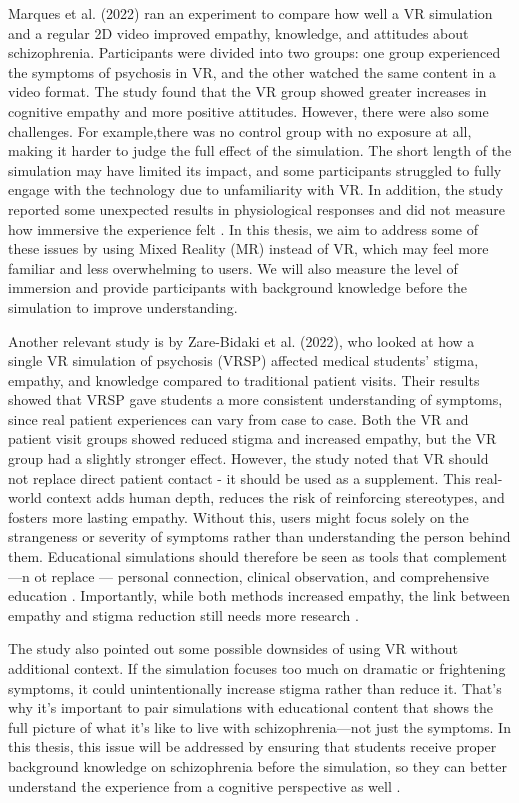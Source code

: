 Marques et al. (2022) ran an experiment to compare how well a VR simulation and a regular 2D video improved empathy, knowledge, and attitudes about schizophrenia. Participants were divided into two groups: one group experienced the symptoms of psychosis in VR, and the other watched the same content in a video format. The study found that the VR group showed greater increases in cognitive empathy and more positive attitudes. However, there were also some challenges. For example,there was no control group with no exposure at all, making it harder to judge the full effect of the simulation. The short length of the simulation may have limited its impact, and some participants struggled to fully engage with the technology due to unfamiliarity with VR. In addition, the study reported some unexpected results in physiological responses and did not measure how immersive the experience felt \cite{Marques2022}. In this thesis, we aim to address some of these issues by using Mixed Reality (MR) instead of VR, which may feel more familiar and less overwhelming to users. We will also measure the level of immersion and provide participants with background knowledge before the simulation to improve understanding. %

Another relevant study is by Zare-Bidaki et al. (2022), who looked at how a single VR simulation of psychosis (VRSP) affected medical students' stigma, empathy, and knowledge compared to traditional patient visits. Their results showed that VRSP gave students a more consistent understanding of symptoms, since real patient experiences can vary from case to case. Both the VR and patient visit groups showed reduced stigma and increased empathy, but the VR group had a slightly stronger effect. However, the study noted that VR should not replace direct patient contact - it should be used as a supplement. This real-world context adds human depth, reduces the risk of reinforcing stereotypes, and fosters more lasting empathy. Without this, users might focus solely on the strangeness or severity of symptoms rather than understanding the person behind them. Educational simulations should therefore be seen as tools that complement —n ot replace — personal connection, clinical observation, and comprehensive education \cite{Zare-Bidaki2022,Hsia2022}.
Importantly, while both methods increased empathy, the link between empathy and stigma reduction still needs more research \cite{Zare-Bidaki2022}.

The study also pointed out some possible downsides of using VR without additional context. If the simulation focuses too much on dramatic or frightening symptoms, it could unintentionally increase stigma rather than reduce it. That's why it's important to pair simulations with educational content that shows the full picture of what it's like to live with schizophrenia—not just the symptoms. In this thesis, this issue will be addressed by ensuring that students receive proper background knowledge on schizophrenia before the simulation, so they can better understand the experience from a cognitive perspective as well \cite{Zare-Bidaki2022}.

